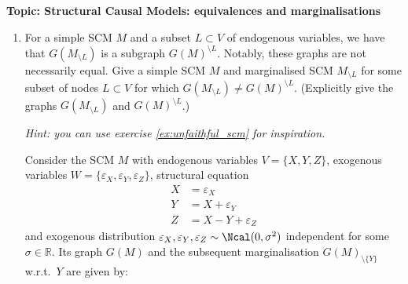 

\flushleft\textbf{Topic: Structural Causal Models: equivalences and marginalisations}

\begin{enumerate}[label=10.\arabic*]
    \item For a simple SCM $M$ and a subset $L \subset V$ of endogenous variables, we have that $G(M_{\setminus L})$ is a subgraph $G(M)^{\setminus L}$. Notably, these graphs are not necessarily equal. Give a simple SCM $M$ and marginalised SCM $M_{\setminus L}$ for some subset of nodes $L\subset V$ for which $G(M_{\setminus L}) \neq G(M)^{\setminus L}$. (Explicitly give the graphs $G(M_{\setminus L})$ and $G(M)^{\setminus L}$.)

    \emph{Hint: you can use exercise \ref*{ex:unfaithful_scm} for inspiration.}
    \begin{ungradedsolution}
        Consider the SCM $M$ with endogenous variables $V = \{X, Y, Z\}$, exogenous variables $W = \{\varepsilon_X, \varepsilon_Y, \varepsilon_Z\}$, structural equation
        \begin{align*}
            X & = \varepsilon_X         \\
            Y & = X + \varepsilon_Y     \\
            Z & = X - Y + \varepsilon_Z
        \end{align*}
        and exogenous distribution $\varepsilon_X, \varepsilon_Y, \varepsilon_Z \sim \Ncal(0, \sigma^2)$ independent for some $\sigma\in\mathbb{R}$. Its graph $G(M)$ and the subsequent marginalisation $G(M)_{\setminus \{Y\}}$ w.r.t.\ $Y$ are given by:
        \begin{figure}[!htb]
            \centering
            \begin{subfigure}[]{0.45\textwidth}
                \centering
\end{subfigure}
\end{figure}
\end{ungradedsolution}
\end{enumerate}
